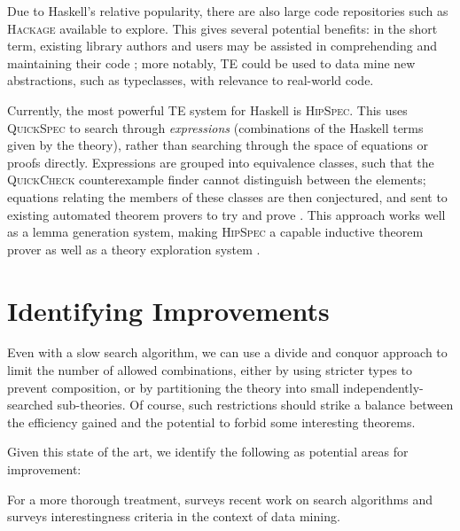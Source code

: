 \documentclass{eceasst}
\begin{document}
Due to Haskell's relative popularity, there are also large code repositories
such as \textsc{Hackage} available to explore. This gives several potential
benefits: in the short term, existing library authors and users may be assisted
in comprehending and maintaining their code \cite{QuickSpec}; more notably, TE
could be used to data mine new abstractions, such as typeclasses, with relevance
to real-world code.

Currently, the most powerful TE system for Haskell is \textsc{HipSpec}.
This uses \textsc{QuickSpec} to search through \emph{expressions}
(combinations of the Haskell terms given by the theory), rather than
searching through the space of equations or proofs directly. Expressions
are grouped into equivalence classes, such that the \textsc{QuickCheck}
counterexample finder cannot distinguish between the elements; equations
relating the members of these classes are then conjectured, and sent to
existing automated theorem provers to try and prove \cite{rosen2012proving}. This
approach works well as a lemma generation system, making
\textsc{HipSpec} a capable inductive theorem prover as well as a theory
exploration system \cite{claessen2013automating}.

\section{Identifying Improvements}

Even with a slow search algorithm, we can use a divide and conquor
approach to limit the number of allowed combinations, either by using
stricter types to prevent composition, or by partitioning the theory
into small independently-searched sub-theories. Of course, such
restrictions should strike a balance between the efficiency gained and
the potential to forbid some interesting theorems.

Given this state of the art, we identify the following as potential
areas for improvement:

For a more thorough treatment,
surveys recent work on search algorithms and  surveys
interestingness criteria in the context of data mining.
\end{document}
